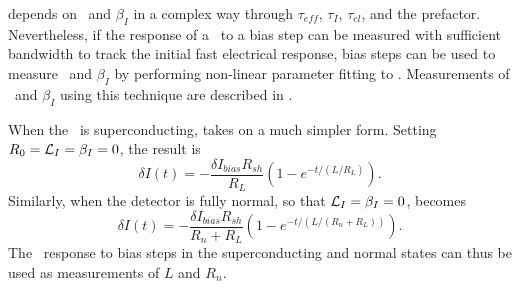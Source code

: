  depends on \Loop\ and $\beta_I$ in a complex way through $\tau_{eff}$, $\tau_I$, $\tau_{el}$, and the prefactor.
Nevertheless, if the response of a \TES\ to a bias step can be measured with sufficient bandwidth to track the initial fast electrical response, bias steps can be used to measure \Loop\ and $\beta_I$ by performing non-linear parameter fitting to .
Measurements of \Loop\ and $\beta_I$ using this technique are described in .

When the \TES\ is superconducting,  takes on a much simpler form.
Setting $R_0 = \mathcal{L}_I = \beta_I = 0$, the result is
\begin{equation}\label{eqn:bias-step-resp-sc}
\delta I(t)
   = - \dfrac{\delta I_{bias} R_{sh}}{R_{L}} 
       \left(1 - e^{-t/(L/R_L)} \right).
\end{equation}
Similarly, when the detector is fully normal, so that $\mathcal{L}_I = \beta_I = 0$,  becomes
\begin{equation}\label{eqn:bias-step-resp-normal}
\delta I(t)
   = - \dfrac{\delta I_{bias} R_{sh}}{R_n + R_{L}} 
       \left(1 - e^{-t/(L/(R_n+R_L))} \right).
\end{equation}
The \TES\ response to bias steps in the superconducting and normal states can thus be used as measurements of $L$ and $R_n$.

